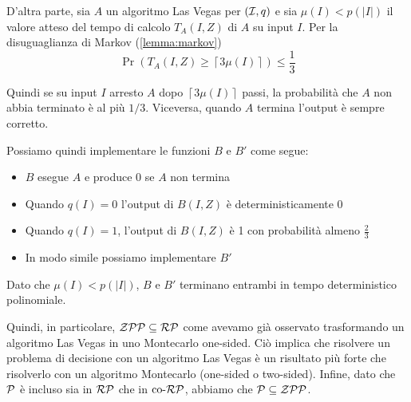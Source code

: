 D'altra parte, sia $A$ un algoritmo Las Vegas per $(\I, q)$ e sia $\mu(I) < p(|I|)$ il valore atteso del tempo di calcolo $T_A (I, Z)$ di $A$ su input $I$. Per la disuguaglianza di Markov (\ref{lemma:markov})
$$ \Pr \left(T_A (I, Z) \geq \left\lceil 3 \mu (I) \right\rceil \right) \leq \frac{1}{3} $$

Quindi se su input $I$ arresto $A$ dopo $\left\lceil 3 \mu (I) \right\rceil$ passi, la probabilità che $A$ non abbia terminato è al più $1/3$. Viceversa, quando $A$ termina l'output è sempre corretto.

Possiamo quindi implementare le funzioni $B$ e $B'$ come segue:
\begin{itemize}
    \item $B$ esegue $A$ e produce 0 se $A$ non termina

    \item Quando $q(I) = 0$ l'output di $B(I,Z)$ è deterministicamente 0

    \item Quando $q(I) = 1$, l'output di $B(I, Z)$ è 1 con probabilità almeno $\frac{2}{3}$

    \item In modo simile possiamo implementare $B'$
\end{itemize}
Dato che $\mu(I) < p(|I|)$, $B$ e $B'$ terminano entrambi in tempo deterministico polinomiale.

Quindi, in particolare, $\ZPP \subseteq \RP$ come avevamo già osservato trasformando un algoritmo Las Vegas in uno Montecarlo one-sided. Ciò implica che risolvere un problema di decisione con un algoritmo Las Vegas è un risultato più forte che risolverlo con un algoritmo Montecarlo (one-sided o two-sided). Infine, dato che $\P$ è incluso sia in $\RP$ che in $\coRP$, abbiamo che $\P \subseteq \ZPP$.

